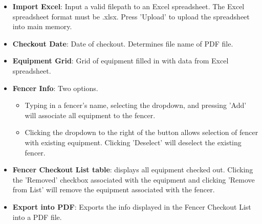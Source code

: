 \documentclass[]{article}
\begin{document}
\begin{itemize}
\item \textbf{Import Excel}: Input a valid filepath to an Excel spreadsheet. The Excel spreadsheet format must be .xlsx. Press 'Upload' to upload the spreadsheet into main memory.

\item \textbf{Checkout Date}: Date of checkout. Determines file name of PDF file.

\item \textbf{Equipment Grid}: Grid of equipment filled in with data from Excel spreadsheet.

\item \textbf{Fencer Info}: Two options.
\begin{itemize}
	\item Typing in a fencer's name, selecting the dropdown, and pressing 'Add' will associate all equipment to the fencer.
	\item Clicking the dropdown to the right of the button allows selection of fencer with existing equipment. Clicking 'Deselect' will deselect the existing fencer.
\end{itemize}

\item \textbf{Fencer Checkout List table}: displays all equipment checked out. Clicking the 'Removed' checkbox associated with the equipment and clicking 'Remove from List' will remove the equipment associated with the fencer.

\item \textbf{Export into PDF}: Exports the info displayed in the Fencer Checkout List into a PDF file.
\end{itemize}
\end{document}
